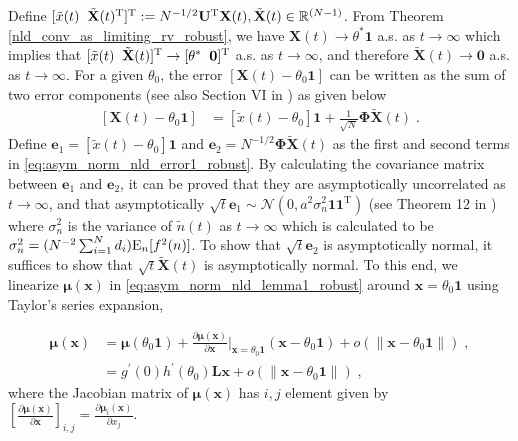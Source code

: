 \documentclass[onecolumn, draft, 12pt]{IEEEtran}
\newcommand{\E}{{\rm E}}
\newcommand{\Rnm}{\mathbb{R}^{(N-1)}}
\newcommand{\onevect}{\mathbf{1}}
\newcommand{\onevectT}{\mathbf{1}^{\mathrm{T}}}
\newcommand{\La}{\mathbf{L}}
\newcommand{\e}{\mathbf{e}}
\newcommand{\UT}{\mathbf{U}^{\mathrm{T}}}
\newcommand{\fiN}{\mathbf{\Phi}}
\newcommand{\x}{\mathbf{x}}
\newcommand{\X}{\mathbf{X}}
\newcommand{\xX}{\mathbf{x}}
\newcommand{\cval}{\ensuremath{\theta^{*}}}
\newcommand{\mx}{\mathbf{\boldsymbol\mu}(\mathbf{x})}
\newcommand{\xtilde}{\tilde{x}}
\newcommand{\xtildet}{\tilde{x}(t)}
\newcommand{\Xtilde}{\tilde{\mathbf{X}}}
\newcommand{\Xtildet}{\tilde{\mathbf{X}}(t)}
\begin{document}
\begin{IEEEproof}
Define $[\xtilde(t) \;\; \Xtilde(t)^{\rm T} ]^{\rm T}:= N^{-1/2}   \UT \X(t), \Xtilde(t) \in \Rnm$. From Theorem \ref{nld_conv_as_limiting_rv_robust}, we have  $\X(t) \rightarrow \cval \onevect$ a.s. as $t \rightarrow \infty$ which implies that $[\xtildet \; \; \Xtildet ]^{\rm T} \rightarrow [\cval \; \; \mathbf{0} ]^{\rm T}$ a.s. as $t \rightarrow \infty$, and therefore $\Xtildet \rightarrow \mathbf{0}$ a.s. as $t \rightarrow \infty$. For a given $\theta_0$, the error $[\X(t) - \theta_0 \onevect]$ can be written as the sum of two error components (see also Section VI in \cite{MinyiHuang2008}) as given below
\begin{align}
\label{eq:asym_norm_nld_error1_robust}
[\X(t) - \theta_0 \onevect]  & = [\xtildet - \theta_0 ] \onevect + \frac{1}{\sqrt{N}} \fiN \Xtildet \;.
\end{align}
Define $\e_1=[\xtildet - \theta_0 ] \onevect$ and $\e_2= N^{-1/2} \fiN \Xtildet$ as the first and second terms in \eqref{eq:asym_norm_nld_error1_robust}. By calculating the covariance matrix between $\e_1$ and $\e_2$, it can be proved that they are asymptotically uncorrelated as $t \rightarrow \infty$, and that asymptotically $\sqrt{t} \e_1 \sim \mathcal{N} (0, a^2 \sigma^2_{n} \onevect \onevectT)$ (see Theorem 12 in \cite{MinyiHuang2008}) where $\sigma^2_{n}$ is the variance of $\tilde{n}(t)$ as $t \rightarrow \infty$ which is calculated to be $\sigma^2_{n} = ( N^{-2}  \sum_{i=1}^{N} d_i ) \E_n [f^2(n)]$. To show that $\sqrt{t} \e_2$ is asymptotically normal, it suffices to show that  $\sqrt{t} \Xtildet$ is asymptotically normal. To this end, we linearize $\mx$ in \eqref{eq:asym_norm_nld_lemma1_robust} around $\xX=\theta_0 \onevect $ using Taylor's series expansion,

\begin{align} \label{eq:asym_norm_nld_proof1_robust}
\mx & = \mathbf{\boldsymbol\mu}(\theta_0 \onevect) + \frac{\partial \mx } {\partial \xX}\bigg|_{ \xX = \theta_0 \onevect} (\xX-\theta_0 \onevect) + o(\|\xX-\theta_0 \onevect\|)\;, \\ \label{eq:asym_norm_nld_proof1a_robust}
       & = g^{'}(0) h^{'}(\theta_0) \La \xX + o(\|\xX-\theta_0 \onevect\|)\;, \end{align}
where the Jacobian matrix of $\mx$ has $i,j$ element given by 
${\left [\frac{\partial \mathbf{\boldsymbol\mu}(\x)}{\partial \xX} \right]}_{i,j} = \frac{\partial \mathbf{\boldsymbol\mu}_{i}(\x)}{\partial x_{j}}$.


\end{IEEEproof}
\end{document}
